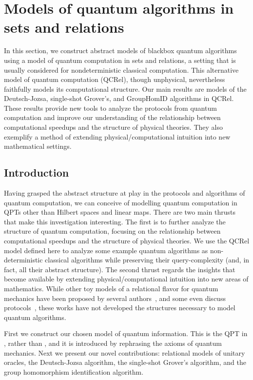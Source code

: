 \section{Models of quantum algorithms in sets and relations}
\label{sec:qalgrel}

        In this section, we construct abstract models of blackbox quantum algorithms using a model of quantum computation in sets and relations, a setting that is usually considered for nondeterministic classical computation.  This alternative model of quantum computation (QCRel), though unphysical, nevertheless faithfully models its computational structure.  Our main results are models of the Deutsch-Jozsa, single-shot Grover's, and GroupHomID algorithms in QCRel. These results provide new tools to analyze the protocols from quantum computation and improve our understanding of the relationship between computational speedups and the structure of physical theories. They also exemplify a method of extending physical/computational intuition into new mathematical settings.

\subsection{Introduction}

Having grasped the abstract structure at play in the protocols and algorithms of quantum computation, we can conceive of modelling quantum computation in QPTs other than Hilbert spaces and linear maps.  There are two main thrusts that make this investigation interesting.  The first is to further analyze the structure of quantum computation, focusing on the relationship between computational speedups and the structure of physical theories. We use the QCRel model defined here to analyze some example quantum algorithms as non-deterministic classical algorithms while preserving their query-complexity (and, in fact, all their abstract structure). The second thrust regards the insights that become available by extending physical/computational intuition into new areas of mathematics. While other toy models of a relational flavor for quantum mechanics have been proposed by several authors~\cite{ellermanModelQM,discreteQT,modalQT,spekk}, and some even discuss protocols~\cite{QCFF_James}, these works have not developed the structures necessary to model quantum algorithms.

First we construct our chosen model of quantum information.  This is the QPT in , rather than , and it is introduced by rephrasing the axioms of quantum mechanics. Next we present our novel contributions: relational models of unitary oracles, the Deutsch-Jozsa algorithm, the single-shot Grover's algorithm, and the group homomorphism identification algorithm.

